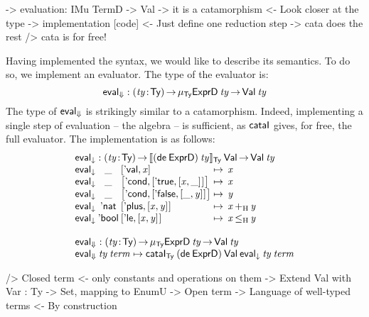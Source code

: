 \begin{wstructure}
    -> evaluation: IMu TermD -> Val
        -> it is a catamorphism
            <- Look closer at the type
        -> implementation [code]
            <- Just define one reduction step
            -> cata does the rest
                /> cata is for free!
\end{wstructure}

\newcommand{\evalH}{\F{eval}_{\green{\Downarrow}}}
\newcommand{\evalOne}{\F{eval}_{\green{\downarrow}}}

Having implemented the syntax, we would like to describe its
semantics. To do so, we implement an evaluator. The type of the
evaluator is:
%
\[
\evalH : \PI{\V{ty}}{\Ty} 
         \IMu{\Ty}{\HExprD}{\V{ty}} \To
         \Val{\V{ty}}
\]
%
The type of $\evalH$ is strikingly similar to a
catamorphism. Indeed, implementing a single step of evaluation -- the
algebra -- is sufficient, as $\cataI$ gives, for free, the full
evaluator. The implementation is as follows:
%
\[\stk{
\evalOne : \PI{\V{ty}}{\Ty} \idescop{(\toIDesc{\HExprD})\:\V{ty}}{\Ty}{\SYMBVal}
           \To {\Val{\V{ty}}} \\
\begin{array}{@{}l@{}c@{}l@{\:\mapsto\:\:}l}
\evalOne\: & \_\: & \pair{\SYMBEval}{\V{x}}{}                                             & \V{x} \\
\evalOne\: & \_\: & \pair{\SYMBEcond}{\pair{\BoolTrue}{\pair{\V{x}}{\_}{}}{}}{}   & \V{x} \\
\evalOne\: & \_\: & \pair{\SYMBEcond}{\pair{\BoolFalse}{\pair{\_}{\V{y}}{}}{}}{}  & \V{y} \\
\evalOne\: & \Enat\: & \pair{\SYMBEplus}{\pair{\V{x}}{\V{y}}{}}{}                     & \V{x} \plusHost \V{y} \\
\evalOne\: & \Ebool\: & \pair{\SYMBEle}{\pair{\V{x}}{\V{y}}{}}{}                      & \V{x} \leHost \V{y} 
\end{array} \\
\\
\evalH : \PI{\V{ty}}{\Ty} 
           \IMu{\Ty}{\HExprD}{\V{ty}} \To
           \Val{\V{ty}} \\
\evalH\: \V{ty}\: \V{term} \mapsto \cataI_{\Ty} \:
                                 (\toIDesc{\HExprD})\: 
                                 \SYMBVal\: 
                                 \evalOne\: 
                                 \V{ty}\: 
                                 \V{term}
}\]

\begin{wstructure}
    /> Closed term
        <- only constants and operations on them
        -> Extend Val with Var : Ty -> Set, mapping to EnumU
            -> Open term
            -> Language of well-typed terms
                <- By construction
\end{wstructure}


